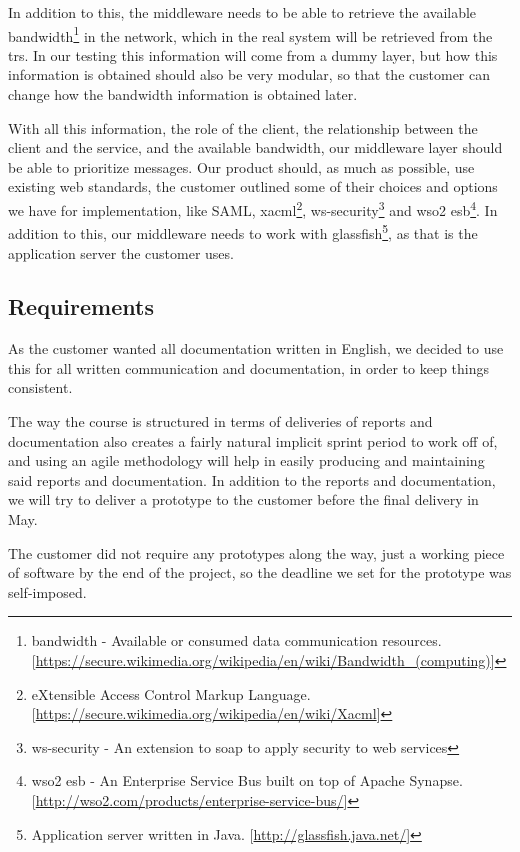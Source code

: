     In addition to this, the middleware needs to be able to retrieve the available \gls{bandwidth}\footnote{\Gls{bandwidth} - Available or consumed data communication resources.[\url{https://secure.wikimedia.org/wikipedia/en/wiki/Bandwidth_(computing)}]} in the network, which in the real system will be retrieved from the \glspl{tr}. In our testing this information will come from a dummy layer, but how this information is obtained should also be very modular, so that the customer can change how the bandwidth information is obtained later.

    With all this information, the role of the client, the relationship between the client and the service, and the available bandwidth, our middleware layer should be able to prioritize messages. Our product should, as much as possible, use existing web standards, the customer outlined some of their choices and options we have for implementation, like SAML, \gls{xacml}\footnote{eXtensible Access Control Markup Language. [\url{https://secure.wikimedia.org/wikipedia/en/wiki/Xacml}]}, \gls{ws-security}\footnote{\gls{ws-security} - An extension to \gls{soap} to apply security to web services} and \gls{wso2 esb}\footnote{\gls{wso2 esb} - An Enterprise Service Bus built on top of Apache Synapse. [\url{http://wso2.com/products/enterprise-service-bus/}]}. In addition to this, our middleware needs to work with \gls{glassfish}\footnote{Application server written in Java. [\url{http://glassfish.java.net/}]}, as that is the application server the customer uses.
   
    \subsection{Requirements}\label{Requirements}
    As the customer wanted all documentation written in English, we decided to use this for all written communication and documentation, in order to keep things consistent.
    
    The way the course is structured in terms of deliveries of reports and documentation also creates a fairly natural implicit sprint period to work off of, and using an agile methodology will help in easily producing and maintaining said reports and documentation. In addition to the  reports and documentation, we will try to deliver a prototype to the customer before the final delivery in May.

    The customer did not require any prototypes along the way, just a working piece of software by the end of the project, so the deadline we set for the prototype was self-imposed. 

